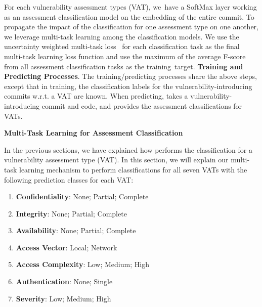 
For each vulnerability assessment types (VAT), we~have a
SoftMax layer working as an assessment classification model on the
embedding of the entire commit.
%
%
To propagate the impact of the classification for one
assessment type on one another, we leverage multi-task learning among
the classification models. We use the uncertainty weighted multi-task
loss~\cite{kendall2018multi} for each classification task as the final
multi-task learning loss function and use the maximum of the average
F-score from all assessment classification tasks as the
training~target. {\bf Training and Predicting Processes}. The training/predicting processes share the above steps, except
that in training, the classification labels for the
vulnerability-introducing commits w.r.t. a VAT are known. When
predicting, {\tool} takes a vulnerability-introducing commit and code, and provides the assessment classifications for
VATs.        

{\bf Multi-Task Learning for Assessment Classification}

In the previous sections, we have explained how {\tool} performs the
classification for a vulnerability assessment type (VAT). In this
section, we will explain our multi-task learning mechanism to perform
classifications for all seven VATs with the following prediction
classes for each VAT:

\begin{enumerate}
	\item {\bf Confidentiality}: None; Partial; Complete
	\item {\bf Integrity}: None; Partial; Complete
	\item {\bf Availability}: None; Partial; Complete
	\item {\bf Access Vector}: Local; Network
	\item {\bf Access Complexity}: Low; Medium; High
	\item {\bf Authentication}: None; Single
	\item {\bf Severity}: Low; Medium; High
\end{enumerate}


